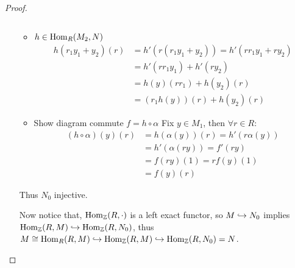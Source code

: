 \begin{theorem}
\begin{proof}
\begin{enumerate}[label={\bf Case \arabic*:}]
\begin{itemize}
\[            \]
          \item $h \in \operatorname{Hom}_R(M_2, N)$
            \[
              \begin{aligned}
                h(r_1y_1 + y_2)(r) &= h'(r(r_1y_1 + y_2))
                = h'(rr_1y_1 + ry_2) \\
                &= h'(rr_1y_1) + h'(ry_2) \\
                &= h(y)(rr_1) + h(y_2)(r) \\
                &= (r_1h(y))(r) + h(y_2)(r)
              \end{aligned}
            \]
          \item Show diagram commute $f = h \circ \alpha$
            Fix $y \in M_1$, then $\forall r \in R$:
            \[
              \begin{aligned}
                (h \circ \alpha)(y)(r) &= h(\alpha(y))(r)  = h'(r\alpha(y))\\
                                      &= h'(\alpha(ry)) = f'(ry) \\
                                      &= f(ry)(1) = rf(y)(1) \\
                                      &= f(y)(r)
              \end{aligned}
            \]
        \end{itemize}
        Thus $N_0$ injective.

        Now notice that, $\operatorname{Hom}_{\mathbb{Z}}(R, \cdot)$ is a left exact functor,
        so $M \hookrightarrow N_0$ implies $\operatorname{Hom}_{\mathbb{Z}}(R, M) \hookrightarrow \operatorname{Hom}_{\mathbb{Z}}(R, N_0)$,
        thus $M \cong \operatorname{Hom}_R(R, M) \hookrightarrow \operatorname{Hom}_{\mathbb{Z}}(R, M) \hookrightarrow 
        \operatorname{Hom}_{\mathbb{Z}}(R,N_0) = N$.
        \qedhere
    \end{enumerate}
 \end{proof}
\end{theorem}

